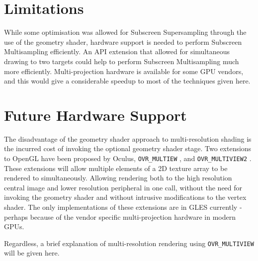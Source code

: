 \documentclass[12pt,a4paper,twoside,openright]{report}
\begin{document}
\section{Limitations}

While some optimisation was allowed for Subscreen Supersampling through the use of the geometry shader, hardware support is needed to perform Subscreen Multisampling efficiently.
An API extension that allowed for simultaneous drawing to two targets could help to perform Subscreen Multisampling much more efficiently.
Multi-projection hardware is available for some GPU vendors\cite{multiResShading}, and this would give a considerable speedup to most of the techniques given here. 

\section{Future Hardware Support}

The disadvantage of the geometry shader approach to multi-resolution shading is the incurred cost of invoking the optional geometry shader stage.
Two extensions to OpenGL have been proposed by Oculus, \texttt{OVR\_MULTIEW} \cite{OVRmultiview}, and \texttt{OVR\_MULTIVIEW2} \cite{OVRmultiview2}. These extensions will allow multiple elements of a 2D texture array to be rendered to simultaneously. Allowing rendering both to the high resolution central image and lower resolution peripheral in one call, without the need for invoking the geometry shader and without intrusive modifications to the vertex shader. The only implementations of these extensions are in GLES currently - perhaps because of the vendor specific multi-projection hardware in modern GPUs.

Regardless, a brief explanation of multi-resolution rendering using \texttt{OVR\_MULTIVIEW} will be given here.
\end{document}
